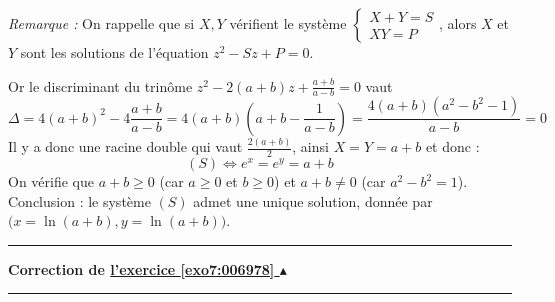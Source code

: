 \documentclass[11pt,a4paper]{article}
\renewcommand{\ge}{\geqslant} \renewcommand{\geq}{\geqslant}
\newcounter{exo}
\newcommand{\correction}[1]{\hypertarget{cor7:#1}{}\label{cor7:#1}{\bf Correction de \hyperlink{exo7:#1}{l'exercice \ref{exo7:#1} $\blacktriangle$}}\vspace{1mm}\hrule\vspace{1mm}}
\newcommand{\fincorrection}{\vspace{1mm}\hrule\vspace*{7mm}}
\begin{document}
\medskip

\emph{Remarque :} On rappelle
que si $X, Y$ vérifient le système 
$\left\{\begin{array}{l}
X+Y=S\\
XY=P
\end{array}\right.$, alors $X$ et $Y$ sont les solutions de l'équation $z^2-Sz+P=0$.
\medskip

Or le discriminant du trinôme $z^2-2(a+b)z+\frac{a+b}{a-b}=0$ vaut 
$$\Delta=4(a+b)^2-4\frac{a+b}{a-b}=4(a+b)\left(a+b-\frac{1}{a-b}\right)=\frac{4(a+b)(a^2-b^2-1)}{a-b}=0$$ 
Il y a donc une racine double qui vaut $\frac{2(a+b)}{2}$, ainsi $X=Y=a+b$ et donc :
$$(S)\Longleftrightarrow e^x=e^y=a+b$$
On vérifie que $a+b\ge 0$ (car $a\ge 0$ et $b\ge 0$) et $a+b\not=0$ (car $a^2-b^2=1$).
Conclusion : le système $(S)$ admet une unique solution, donnée par $\big(x=\ln(a+b),y=\ln(a+b)\big)$. 
\fincorrection
\correction{006978}\
\end{document}
